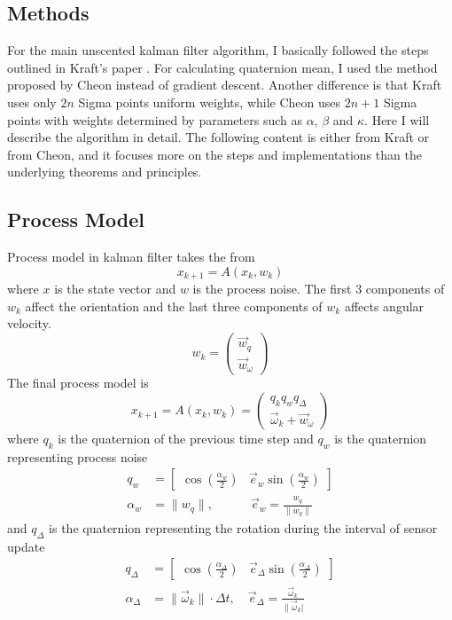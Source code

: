 \documentclass[twoside]{article}
\begin{document}
\begin{multicols}{2}
\section{Methods}
For the main unscented kalman filter algorithm, I basically followed the steps outlined in Kraft's paper \cite{Kraft03}. For calculating quaternion mean, I used the method proposed by Cheon \cite{Cheon07} instead of gradient descent. Another difference is that Kraft uses only $2n$ Sigma points uniform weights, while Cheon uses $2n+1$ Sigma points with weights determined by parameters such as $\alpha$, $\beta$ and $\kappa$. Here I will describe the algorithm in detail. The following content is either from Kraft or from Cheon, and it focuses more on the steps and implementations than the underlying theorems and principles.

\subsection{Process Model}
Process model in kalman filter takes the from
\begin{equation}
x_{k+1} = A(x_k, w_k)    
\end{equation}
where $x$ is the state vector and $w$ is the process noise. The first 3 components of $w_k$ affect the orientation and the last three components of $w_k$ affects angular velocity.
\begin{equation}
w_k = \begin{pmatrix}\vec{w}_q \\ \vec{w}_\omega \end{pmatrix}
\end{equation}
The final process model is 
\begin{equation}
x_{k+1} = A(x_k, w_k) = \begin{pmatrix} q_k q_w q_{\Delta}\\ \vec{\omega}_k + \vec{w}_\omega \end{pmatrix}
\end{equation}
where $q_k$ is the quaternion of the previous time step and $q_w$ is the quaternion representing process noise
\begin{align}
q_w &= \begin{bmatrix}
\cos\left(\frac{\alpha_w}{2}\right) & \vec{e}_w \sin \left(\frac{\alpha_w}{2} \right)\end{bmatrix}\\
\alpha_w &= \|w_q\|, \quad\qquad \vec{e}_w = \frac{w_q}{\|w_q\|}
\end{align}
and $q_\Delta$ is the quaternion representing the rotation during the interval of sensor update
\begin{align}
q_\Delta &= \begin{bmatrix}
\cos\left(\frac{\alpha_\Delta}{2}\right) & \vec{e}_\Delta \sin \left(\frac{\alpha_\Delta}{2} \right)\end{bmatrix}\\
\alpha_\Delta &= \|\vec{\omega}_k\|\cdot \Delta t, \quad \vec{e}_\Delta = \frac{\vec{\omega}_k}{\|\vec{\omega}_k|}
\end{align}


\end{multicols}
\end{document}
